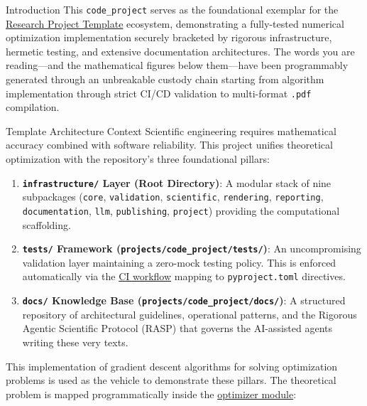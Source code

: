 \documentclass[
  ignorenonframetext,
]{beamer}
\author{\texorpdfstring{}{}}
\date{}
\providecommand{\tightlist}{%
  \setlength{\itemsep}{0pt}\setlength{\parskip}{0pt}}
\begin{document}
\begin{frame}[fragile]{Introduction}
\protect{}\label{introduction}
This \texttt{code\_project} serves as the foundational exemplar for the
\href{https://github.com/docxology/template}{Research Project Template}
ecosystem, demonstrating a fully-tested numerical optimization
implementation securely bracketed by rigorous infrastructure, hermetic
testing, and extensive documentation architectures. The words you are
reading---and the mathematical figures below them---have been
programmably generated through an unbreakable custody chain starting
from algorithm implementation through strict CI/CD validation to
multi-format \texttt{.pdf} compilation.

\begin{block}{Template Architecture Context}
\protect{}\label{template-architecture-context}
Scientific engineering requires mathematical accuracy combined with
software reliability. This project unifies theoretical optimization with
the repository's three foundational pillars:

\begin{enumerate}
\tightlist
\item
  \textbf{\texttt{infrastructure/} Layer (Root Directory)}: A modular
  stack of nine subpackages (\texttt{core}, \texttt{validation},
  \texttt{scientific}, \texttt{rendering}, \texttt{reporting},
  \texttt{documentation}, \texttt{llm}, \texttt{publishing},
  \texttt{project}) providing the computational scaffolding.
\item
  \textbf{\texttt{tests/} Framework
  (\texttt{projects/code\_project/tests/})}: An uncompromising
  validation layer maintaining a zero-mock testing policy. This is
  enforced automatically via the
  \href{https://github.com/docxology/template/blob/main/.github/workflows/ci.yml}{CI
  workflow} mapping to \texttt{pyproject.toml} directives.
\item
  \textbf{\texttt{docs/} Knowledge Base
  (\texttt{projects/code\_project/docs/})}: A structured repository of
  architectural guidelines, operational patterns, and the Rigorous
  Agentic Scientific Protocol (RASP) that governs the AI-assisted agents
  writing these very texts.
\end{enumerate}

This implementation of gradient descent algorithms for solving
optimization problems is used as the vehicle to demonstrate these
pillars. The theoretical problem is mapped programmatically inside the
\href{https://github.com/docxology/template/blob/main/projects/code_project/src/optimizer.py}{optimizer
module}:


\end{block}
\end{frame}
\end{document}
